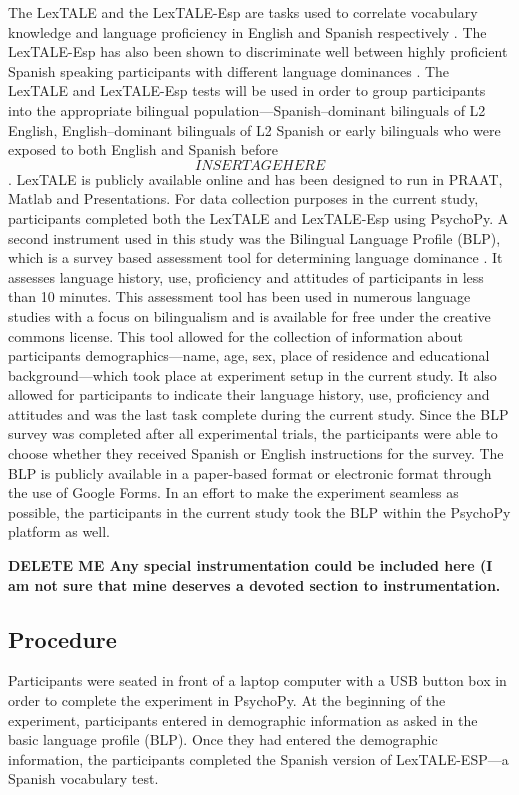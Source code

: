 The LexTALE and the LexTALE-Esp are tasks used to correlate vocabulary knowledge and language proficiency in English and Spanish respectively \parencite{Izura2014-yw,Lemhofer2012-hz}. The LexTALE-Esp has also been shown to discriminate well between highly proficient Spanish speaking participants with different language dominances \parencite{Ferre2017-jq}. The LexTALE and LexTALE-Esp tests will be used in order to group participants into the appropriate bilingual population—Spanish–dominant bilinguals of L2 English, English–dominant bilinguals of L2 Spanish or early bilinguals who were exposed to both English and Spanish before \[INSERT AGE HERE\]. LexTALE is publicly available online and has been designed to run in PRAAT, Matlab and Presentations. For data collection purposes in the current study, participants completed both the LexTALE and LexTALE-Esp using PsychoPy. 
A second instrument used in this study was the Bilingual Language Profile (BLP), which is a survey based assessment tool for determining language dominance \parencite{Birdsong2012-wd}. It assesses language history, use, proficiency and attitudes of participants in less than 10 minutes. This assessment tool has been used in numerous language studies with a focus on bilingualism and is available for free under the creative commons license. This tool allowed for the collection of information about participants demographics---name, age, sex, place of residence and educational background---which took place at experiment setup in the current study. It also allowed for participants to indicate their language history, use, proficiency and attitudes and was the last task complete during the current study. Since the BLP survey was completed after all experimental trials, the participants were able to choose whether they received Spanish or English instructions for the survey. The BLP is publicly available in a paper-based format or electronic format through the use of Google Forms. In an effort to make the experiment seamless as possible, the participants in the current study took the BLP within the PsychoPy platform as well. 


\textbf{DELETE ME Any special instrumentation could be included here (I am not sure that mine deserves a devoted section to instrumentation.}


\subsection{Procedure}
Participants were seated in front of a laptop computer with a USB button box in order to complete the experiment in PsychoPy. At the beginning of the experiment, participants entered in demographic information as asked in the basic language profile (BLP). Once they had entered the demographic information, the participants completed the Spanish version of LexTALE-ESP---a Spanish vocabulary test. 

